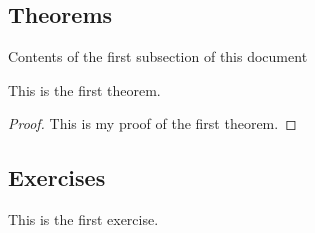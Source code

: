 \subsection{Theorems}
Contents of the first subsection of this document
\begin{theorem}\label{thm:1.1}
    This is the first theorem.
\end{theorem}
\begin{proof}
    This is my proof of the first theorem.
\end{proof}
%
\subsection{Exercises}
\begin{exercise}\label{ex:1.1}
    This is the first exercise.
\end{exercise}
% 
% 